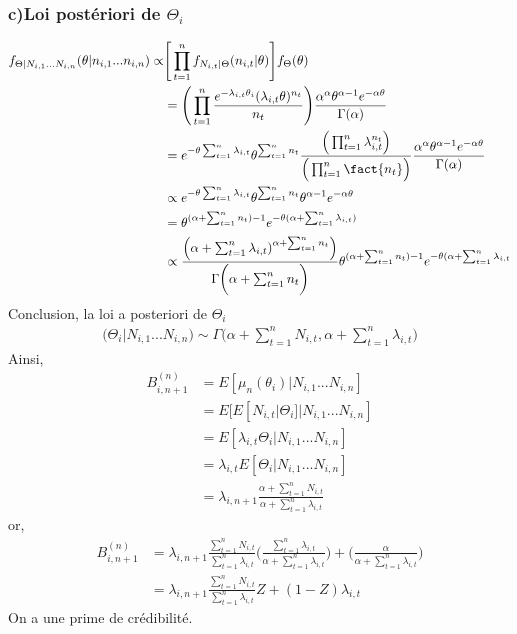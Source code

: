 \subsubsection*{c)Loi postériori de $\Theta_i$}
\begin{align*}
f_{\Theta|N_{i,1}...N_{i,n}}(\theta|n_{i,1}...n_{i,n}) \propto& \Bigg[ \prod_{t=1}^{n} f_{N_{i,t}|\Theta}(n_{i,t}|\theta) \Bigg] f_{\Theta}(\theta) \\
&= \Bigg(\prod_{t=1}^{n} \frac{e^{- \lambda_{i,t} \theta_i}(\lambda_{i,t}\theta)^{n_t}}{n_t} \Bigg) \frac{\alpha^{\alpha} \theta^{\alpha-1}e^{-\alpha \theta}}{\Gamma(\alpha)} \\
&= e^{-\theta \sum_{t=1}^{n}\lambda_{i,t}} \theta^{\sum_{t=1}^{n}n_t} \frac{\Big( \prod_{t=1}^{n} \lambda_{i,t}^{n_t} \Big)}{\Big( \prod_{t=1}^{n} \fact{n_t} \Big)}\frac{\alpha^{\alpha} \theta^{\alpha-1}e^{-\alpha \theta}}{\Gamma(\alpha)} \\
&\propto e^{-\theta \sum_{t=1}^{n}\lambda_{i,t}} \theta^{\sum_{t=1}^{n}n_t} \theta^{\alpha-1}e^{-\alpha \theta} \\
&=  \theta^{(\alpha + \sum_{t=1}^{n}n_t) -1}e^{-\theta(\alpha + \sum_{t=1}^{n}\lambda_{i,t})}\\
&\propto \frac{\Big(\alpha + \sum_{t=1}^{n}\lambda_{i,t})^{\alpha + \sum_{t=1}^{n}n_t} \Big)}{\Gamma\bigg( \alpha + \sum_{t=1}^{n}n_t \bigg)}\theta^{(\alpha + \sum_{t=1}^{n}n_t) -1}e^{-\theta(\alpha + \sum_{t=1}^{n}\lambda_{i,t}}\\
\end{align*}
Conclusion, la loi a posteriori de $\Theta_i$
\begin{align*}
\Big(\Theta_i|N_{i,1}...N_{i,n} \Big) \sim \Gamma\Bigg(\alpha + \sum_{t=1}^{n} N_{i,t}, \alpha + \sum_{t=1}^{n}\lambda_{i,t}\Bigg)
\end{align*}
Ainsi, 
\begin{align*}
B_{i,n+1}^{(n)} &= E[\mu_n(\theta_i)|N_{i,1}...N_{i,n}] \\
&= E[E[N_{i,t}|\Theta_i]|N_{i,1}...N_{i,n}]\\
&= E[\lambda_{i,t} \Theta_i|N_{i,1}...N_{i,n}]\\
&=\lambda_{i,t} E[\Theta_i|N_{i,1}...N_{i,n}]\\
&= \lambda_{i,n+1} \frac{\alpha + \sum_{t=1}^{n} N_{i,t}}{\alpha + \sum_{t=1}^{n} \lambda_{i,t}}
\end{align*}
or, 
\begin{align*}
B_{i,n+1}^{(n)} &= \lambda_{i,n+1} \frac{\sum_{t=1}^{n} N_{i,t}}{\sum_{t=1}^{n} \lambda_{i,t}} \Bigg( \frac{\sum_{t=1}^{n} \lambda_{i,t}}{\alpha + \sum_{t=1}^{n} \lambda_{i,t}}\Bigg) + \Bigg( \frac{\alpha}{\alpha + \sum_{t=1}^{n} \lambda_{i,t}}\Bigg) \\
&= \lambda_{i,n+1} \frac{\sum_{t=1}^{n} N_{i,t}}{\sum_{t=1}^{n} \lambda_{i,t}} Z + (1 - Z) \lambda_{i,t}
\end{align*}
On a une prime de crédibilité.

